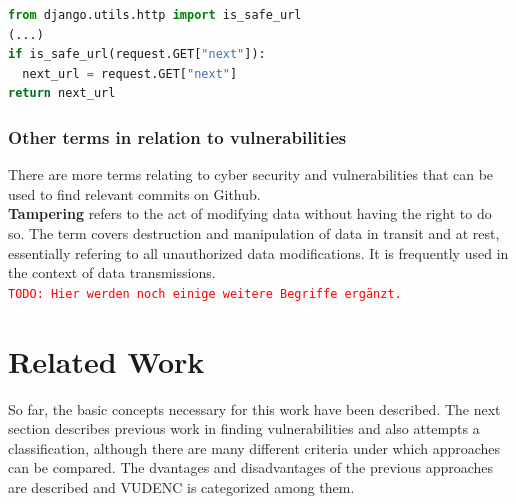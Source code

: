 \documentclass[
	a4paper,
	pagesize,
	pdftex,
	12pt,
	twoside, %
	BCOR=5mm, %
	ngerman,
	fleqn,
	final,
	]{scrartcl}
\begin{document}
\begin{lstlisting}[language=Python, showstringspaces=False]
from django.utils.http import is_safe_url
(...)
if is_safe_url(request.GET["next"]):
  next_url = request.GET["next"]
return next_url
\end{lstlisting}


\subsubsection{Other terms in relation to vulnerabilities}
There are more terms relating to cyber security and vulnerabilities that can be used to find relevant commits on Github.\\
\textbf{Tampering} refers to the act of modifying data without having the right to do so. The term covers destruction and manipulation of data in transit and at rest, essentially refering to all unauthorized data modifications. It is frequently used in the context of data transmissions.\\


\textcolor{red}{\texttt{TODO: Hier werden noch einige weitere Begriffe ergänzt.}}

\newpage
\section{Related Work}\label{Related-Work}

So far, the basic concepts necessary for this work have been described. The next section describes previous work in finding vulnerabilities and also attempts a classification, although there are many different criteria under which approaches can be compared. The dvantages and disadvantages of the previous approaches are described and VUDENC is categorized among them.
\end{document}

